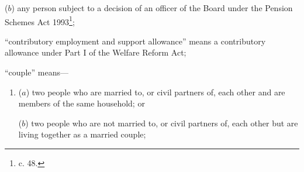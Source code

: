 \documentclass[12pt,a4paper]{article}
\begin{document}
\begin{enumerate}
\begin{enumerate}
($b$) any person subject to a decision of 
an officer of the Board  %
under the Pension Schemes Act 1993\footnote{ c. 48.};
\end{enumerate}



“contributory employment and support allowance” means a contributory allowance under Part I of the Welfare Reform Act;

%
%
%

“couple” means—
\begin{enumerate}\item[]
($a$) 
two people who are married to, or civil partners of, each other and are members of the same household; or

($b$) 
two people who are not married to, or civil partners of, each other but are living together as a married couple;
\end{enumerate}


\end{enumerate}
\end{document}
